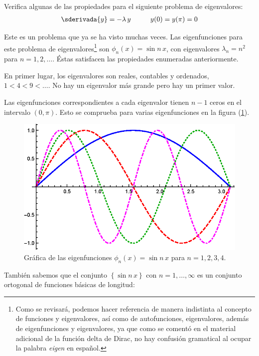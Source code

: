 \begin{ejemplo}
Verifica algunas de las propiedades para el siguiente problema de eigenvalores:
\begin{align*}
\sderivada{y} = - \lambda \, y \hspace{1cm} y(0) = y(\pi) = 0
\end{align*}

Este es un problema que ya se ha visto muchas veces. Las eigenfunciones para este problema de eigenvalores\footnote{Como se revisará, podemos hacer referencia de manera indistinta al concepto de funciones y eigenvalores, así como de autofunciones, eigenvalores, además de eigenfunciones y eigenvalores, ya que como se comentó en el material adicional de la función delta de Dirac, no hay confusión gramatical al ocupar la palabra \emph{eigen} en español.} son $\phi_{n} (x) = \sin n\, x$, con eigenvalores $\lambda_{n} = n^{2}$ para $n = 1, 2, \ldots$. Éstas satisfacen las propiedades enumeradas anteriormente.
\par
En primer lugar, los eigenvalores son reales, contables y ordenados, $1 < 4 < 9 < \ldots$. No hay un eigenvalor más grande pero hay un primer valor.
\par
Las eigenfunciones correspondientes a cada eigenvalor tienen $n -1$ ceros en el intervalo $(0, \pi)$. Esto se comprueba para varias eigenfunciones en la figura (\ref{fig:figura_04_01}).
\begin{figure}[H]
    \centering
    \includegraphics[scale=1.3]{Imagenes/Eigenfunciones_Sin_nx.eps}
    \caption{Gráfica de las eigenfunciones $\phi_{n} (x) = \sin n \,x$ para $n = 1, 2, 3, 4$.}
    \label{fig:figura_04_01}
\end{figure}
También sabemos que el conjunto $\left\{ \sin n \, x \right\}$ con $n = 1, \ldots, \infty$ es un conjunto ortogonal de funciones básicas de longitud:

\end{ejemplo}
